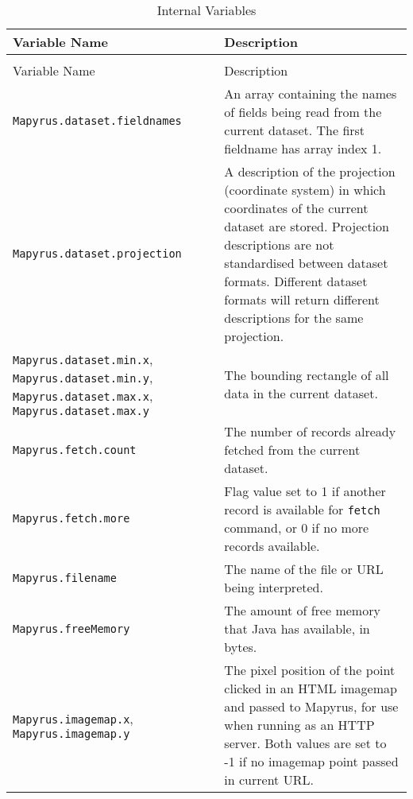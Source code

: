 \begin{longtable}{|p{6cm}|p{7cm}|}
\hline
\label{internalvariables}
Variable Name & Description \\
\hline
\hline
\endfirsthead
\hline
\caption{Internal Variables} \\
\endfoot

\hline
Variable Name & Description \\
\hline
\hline
\endhead

\texttt{Mapyrus.dataset.fieldnames} &
An array containing the names of fields being read from
the current dataset.  The first fieldname has array index 1. \\

\hline

\texttt{Mapyrus.dataset.projection} &
A description of the projection (coordinate system) in which coordinates
of the current dataset are stored.
Projection descriptions are not standardised between dataset formats.
Different dataset formats will return different descriptions for the same
projection. \\

\hline

\texttt{Mapyrus.dataset.min.x},
\texttt{Mapyrus.dataset.min.y},
\texttt{Mapyrus.dataset.max.x},
\texttt{Mapyrus.dataset.max.y} &
The bounding rectangle of all data in the current dataset. \\

\hline

\texttt{Mapyrus.fetch.count} &
The number of records already fetched from the current dataset. \\

\hline

\texttt{Mapyrus.fetch.more} &
Flag value set to 1 if another record is available
for \texttt{fetch}
command, or 0 if no more records available. \\

\hline

\texttt{Mapyrus.filename} &
The name of the file or URL being interpreted. \\

\hline

\texttt{Mapyrus.freeMemory} &
The amount of free memory that Java has available, in bytes. \\

\hline

\texttt{Mapyrus.imagemap.x},
\texttt{Mapyrus.imagemap.y} &
The pixel position of the point clicked in an HTML imagemap and
passed to Mapyrus, for use when running as an HTTP server.
Both values are set to -1 if no imagemap point passed in current URL. \\


\end{longtable}
